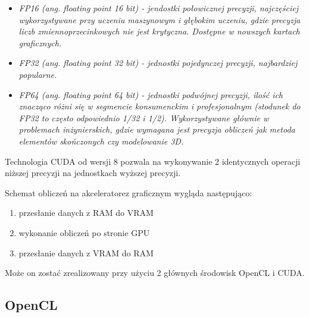 \begin{itemize}
	\item \it{FP16} (ang. floating point 16 bit) - jendostki połowicznej precyzji, najczęściej wykorzystywane przy uczeniu maszynowym i głębokim uczeniu, gdzie precyzja liczb zmiennoprzecinkowych nie jest krytyczna. Dostępne w nowszych kartach graficznych.
	\item \it{FP32} (ang. floating point 32 bit) - jednostki pojedynczej precyzji, najbardziej popularne.
	\item \it{FP64} (ang. floating point 64 bit) - jednostki podwójnej precyzji, ilość ich znacząco różni się w segmencie konsumenckim i profesjonalnym (stodunek do FP32 to często odpowiednio 1/32 i 1/2). Wykorzystywane głównie w problemach inżynierskich, gdzie wymagana jest precyzja obliczeń jak metoda elementów skończonych czy modelowanie 3D.
\end{itemize}
Technologia CUDA od wersji 8 pozwala na wykonywanie 2 identycznych operacji niższej precyzji na jednostkach wyższej precyzji. \cite{Mix16}

Schemat obliczeń na akceleratorez graficznym wygląda następująco:
\begin{enumerate}
	\item przesłanie danych z RAM do VRAM
	\item wykonanie obliczeń po stronie GPU
	\item przesłanie danych z VRAM do RAM
\end{enumerate}

Może on zostać zrealizowany przy użyciu 2 głównych środowisk OpenCL i CUDA.

\subsection{OpenCL}


































 